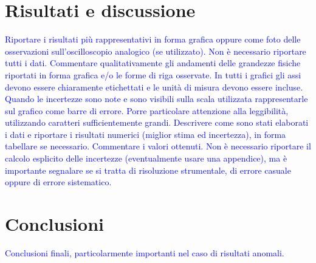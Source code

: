 \documentclass[12pt,italian]{article}
\newcommand{\prof}[1]{\textcolor{blue}{#1}}
\begin{document}
\section*{Risultati e discussione}
\prof{ Riportare i risultati più rappresentativi in forma grafica oppure come
  foto delle osservazioni sull'oscilloscopio analogico (se utilizzato). Non è
  necessario riportare tutti i dati. Commentare qualitativamente gli andamenti
  delle grandezze fisiche riportati in forma grafica e/o le forme di riga
  osservate. In tutti i grafici gli assi devono essere chiaramente etichettati e
  le unità di misura devono essere incluse. Quando le incertezze sono note e
  sono visibili sulla scala utilizzata rappresentarle sul grafico come barre di
  errore. Porre particolare attenzione alla leggibilità, utilizzando caratteri
  sufficientemente grandi. Descrivere come sono stati elaborati i dati e
  riportare i risultati numerici (miglior stima ed incertezza), in forma
  tabellare se necessario. Commentare i valori ottenuti. Non è necessario
  riportare il calcolo esplicito delle incertezze (eventualmente usare una
  appendice), ma è importante segnalare se si tratta di risoluzione strumentale,
  di errore casuale oppure di errore sistematico. }

\section*{Conclusioni}
\prof{Conclusioni finali, particolarmente importanti nel caso di risultati
  anomali.}
\end{document}
